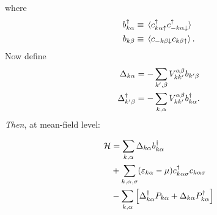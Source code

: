 where
\begin{align}
	b_{k\alpha}^{\dg}&\equiv \ev*{\cd_{k\alpha\uparrow}\cd_{-k\alpha\downarrow}} \\ 
	b_{k\beta} &\equiv \ev*{c_{-k\beta\downarrow}c_{k\beta\uparrow}}.
\end{align}
Now define
\begin{align}
	\Delta_{k\alpha} &= -\sum_{k', \beta}V_{kk'}^{\alpha\beta}b_{k'\beta} \\
	\Delta_{k'\beta}^{\dagger} &= -\sum_{k,\alpha}V_{kk'}^{\alpha\beta}b_{k\alpha}^{\dagger}.
\end{align}
\emph{Then}, at mean-field level: 
\begin{tcolorbox}
	\begin{equation}
		\begin{aligned}
			\mathcal{H} &= \sum_{k,\alpha}\Delta_{k\alpha}b_{k\alpha}^{\dagger} \\
			&+\sum_{k,\alpha, \sigma}(\varepsilon_{k\alpha}-\mu)c^{\dagger}_{k\alpha\sigma}c_{k\alpha\sigma} \\
			&- \sum_{k,\alpha}\left [\Delta_{k\alpha}^{\dagger}P_{k\alpha} + \Delta_{k\alpha}P_{k\alpha}^{\dagger}\right ]
		\end{aligned}
	\end{equation}
\end{tcolorbox}

